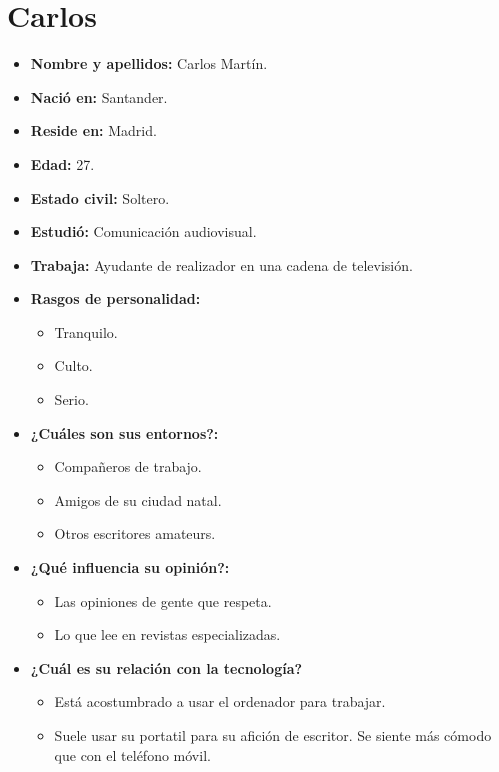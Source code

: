 \section{Carlos}
\begin{itemize}
    \item \textbf{Nombre y apellidos: } Carlos Martín.
    \item \textbf{Nació en: } Santander.
    \item \textbf{Reside en: } Madrid.
    \item \textbf{Edad: } 27.
    \item \textbf{Estado civil: } Soltero.
    \item \textbf{Estudió: } Comunicación audiovisual.
    \item \textbf{Trabaja: } Ayudante de realizador en una cadena de televisión.
    \item \textbf{Rasgos de personalidad: } 
    \begin{itemize}
      \item Tranquilo.
      \item Culto.
      \item Serio.
    \end{itemize}
    \item \textbf{¿Cuáles son sus entornos?: } 
    \begin{itemize}
      \item Compañeros de trabajo.
      \item Amigos de su ciudad natal.
      \item Otros escritores amateurs.
    \end{itemize}
    \item \textbf{¿Qué influencia su opinión?: } 
    \begin{itemize}
      \item Las opiniones de gente que respeta.
      \item Lo que lee en revistas especializadas.
    \end{itemize}
    \item \textbf{¿Cuál es su relación con la tecnología?} 
  \begin{itemize}
    \item Está acostumbrado a usar el ordenador para trabajar.
    \item Suele usar su portatil para su afición de escritor. Se siente más cómodo que con el teléfono móvil.
  \end{itemize}
  \end{itemize}
